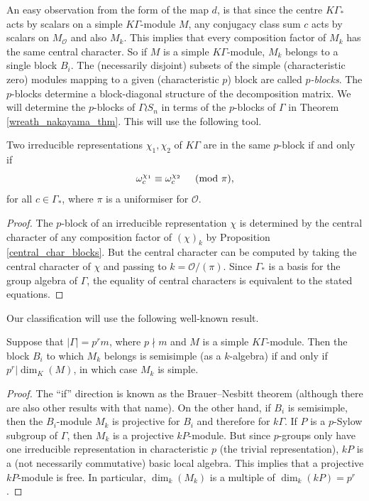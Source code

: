 \documentclass[ALCO,Unicode]{cedram}
\begin{document}
An easy observation from the form of the map $d$, is that since the centre $K\Gamma_*$ acts by scalars on a simple $K\Gamma$-module $M$, any conjugacy class sum $c$ acts by scalars on $M_{\mathcal{O}}$ and also $M_{k}$. This implies that every composition factor of $M_k$ has the same central character. So if $M$ is a simple $K\Gamma$-module, $M_{k}$ belongs to a single block $B_i$. The (necessarily disjoint) subsets of the simple (characteristic zero) modules mapping to  a given (characteristic $p$) block are called \emph{$p$-blocks}. The $p$-blocks determine a block-diagonal structure of the decomposition matrix. We will determine the $p$-blocks of $\Gamma \wr S_n$ in terms of the $p$-blocks of $\Gamma$ in Theorem \ref{wreath_nakayama_thm}. 
This will use the following tool.
\begin{proposition} \label{block_prop}
Two irreducible representations $\chi_1, \chi_2$ of $K\Gamma$ are in the same $p$-block if and only if
\[
\omega_c^{\chi_1} \equiv \omega_c^{\chi_2} \hspace{5mm} (\mbox{$\mathrm{mod}$ $\pi$}),
\]
for all $c \in \Gamma_*$, where $\pi$ is a uniformiser for $\mathcal{O}$.
\end{proposition}
\begin{proof}
The $p$-block of an irreducible representation $\chi$ is determined by the central character of any composition factor of $(\chi)_k$ by Proposition \ref{central_char_blocks}. But the central character can be computed by taking the central character of $\chi$ and passing to $k = \mathcal{O}/(\pi)$. Since $\Gamma_*$ is a basis for the group algebra of $\Gamma$, the equality of central characters is equivalent to the stated equations.
\end{proof}

Our classification will use the following well-known result.
\begin{proposition} \label{brauer_nesbitt_prop}
Suppose that $|\Gamma| = p^r m$, where $p \nmid m$ and $M$ is a simple $K\Gamma$-module. Then the block $B_i$ to which $M_k$ belongs is semisimple (as a $k$-algebra) if and only if $p^r | \dim_K(M)$, in which case $M_k$ is simple.
\end{proposition}
\begin{proof}
The ``if'' direction is known as the Brauer--Nesbitt theorem (although there are also other results with that name). On the other hand, if $B_i$ is semisimple, then the $B_i$-module $M_k$ is projective for $B_i$ and therefore for $k\Gamma$. If $P$ is a $p$-Sylow subgroup of $\Gamma$, then $M_k$ is a projective $kP$-module. But since $p$-groups only have one irreducible representation in characteristic $p$ (the trivial representation), $kP$ is a (not necessarily commutative) basic local algebra. This implies that a projective $kP$-module is free. In particular, $\dim_k(M_k)$ is a multiple of $\dim_k(kP) = p^r$.
\end{proof}
\end{document}
